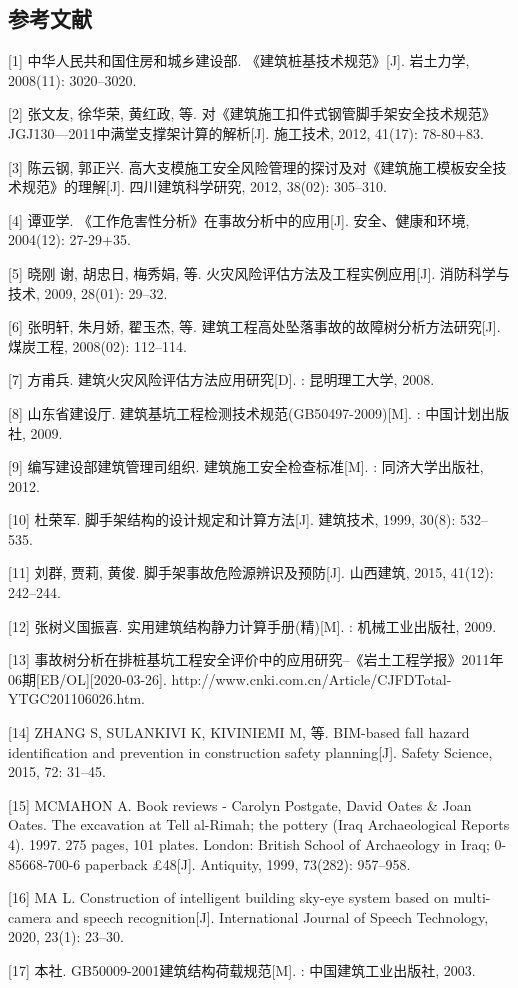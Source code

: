 \begin{center}
    \section*{  \textbf{参考文献}}
    \end{center}

{ \songti 

[1]	中华人民共和国住房和城乡建设部. 《建筑桩基技术规范》[J]. 岩土力学, 2008(11): 3020–3020.

[2]	张文友, 徐华荣, 黄红政, 等. 对《建筑施工扣件式钢管脚手架安全技术规范》JGJ130—2011中满堂支撑架计算的解析[J]. 施工技术, 2012, 41(17): 78-80+83.

[3]	陈云钢, 郭正兴. 高大支模施工安全风险管理的探讨及对《建筑施工模板安全技术规范》的理解[J]. 四川建筑科学研究, 2012, 38(02): 305–310.

[4]	谭亚学. 《工作危害性分析》在事故分析中的应用[J]. 安全、健康和环境, 2004(12): 27-29+35.

[5]	晓刚 谢, 胡忠日, 梅秀娟, 等. 火灾风险评估方法及工程实例应用[J]. 消防科学与技术, 2009, 28(01): 29–32.

[6]	张明轩, 朱月娇, 翟玉杰, 等. 建筑工程高处坠落事故的故障树分析方法研究[J]. 煤炭工程, 2008(02): 112–114.

[7]	方甫兵. 建筑火灾风险评估方法应用研究[D]. : 昆明理工大学, 2008.

[8]	山东省建设厅. 建筑基坑工程检测技术规范(GB50497-2009)[M]. : 中国计划出版社, 2009.

[9]	编写建设部建筑管理司组织. 建筑施工安全检查标准[M]. : 同济大学出版社, 2012.

[10]	杜荣军. 脚手架结构的设计规定和计算方法[J]. 建筑技术, 1999, 30(8): 532–535.

[11]	刘群, 贾莉, 黄俊. 脚手架事故危险源辨识及预防[J]. 山西建筑, 2015, 41(12): 242–244.

[12]	张树义国振喜. 实用建筑结构静力计算手册(精)[M]. : 机械工业出版社, 2009.

[13]	事故树分析在排桩基坑工程安全评价中的应用研究--《岩土工程学报》2011年06期[EB/OL][2020-03-26]. http://www.cnki.com.cn/Article/CJFDTotal-YTGC201106026.htm.

[14]	ZHANG S, SULANKIVI K, KIVINIEMI M, 等. BIM-based fall hazard identification and prevention in construction safety planning[J]. Safety Science, 2015, 72: 31–45.

[15]	MCMAHON A. Book reviews - Carolyn Postgate, David Oates \& Joan Oates. The excavation at Tell al-Rimah; the pottery (Iraq Archaeological Reports 4). 
1997. 275 pages, 101 plates. London: British School of Archaeology in Iraq; 0-85668-700-6 paperback £48[J]. Antiquity, 1999, 73(282): 957–958.

[16]	MA L. Construction of intelligent building sky-eye system based on multi-camera and speech recognition[J]. 
International Journal of Speech Technology, 2020, 23(1): 23–30.

[17]	本社. GB50009-2001建筑结构荷载规范[M]. : 中国建筑工业出版社, 2003.


}